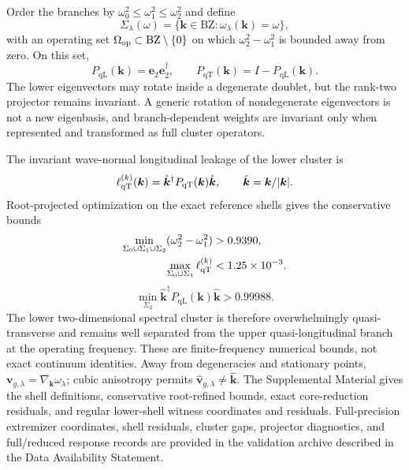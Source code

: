 \documentclass[10pt,aps,pre,reprint,floatfix,notitlepage,nofootinbib]{revtex4-2}
\newcommand{\vk}{\bm{k}}
\newcommand{\ve}{\bm{e}}
\newcommand{\BZ}{\mathrm{BZ}}
\newcommand{\PqT}{P_{\mathrm{qT}}}
\newcommand{\PqL}{P_{\mathrm{qL}}}
\begin{document}
Order the branches by $\omega_0^2\leq\omega_1^2\leq\omega_2^2$ and define
\begin{equation}
  \Sigma_\lambda(\omega)
  =\{\vk\in\BZ:\omega_\lambda(\vk)=\omega\},
  \label{eq:s4-branch-shell}
\end{equation}
with an operating set $\Omega_{\rm op}\subset\BZ\setminus\{0\}$ on which
$\omega_2^2-\omega_1^2$ is bounded away from zero.  On this set,
\begin{equation}
  \PqL(\vk)=\ve_2\ve_2^\dagger,
  \qquad
  \PqT(\vk)=I-\PqL(\vk).
  \label{eq:s4-cluster-projectors}
\end{equation}
The lower eigenvectors may rotate inside a degenerate doublet, but the rank-two projector remains invariant.  A generic rotation of nondegenerate eigenvectors is not a new eigenbasis, and branch-dependent weights are invariant only when represented and transformed as full cluster operators.

The invariant wave-normal longitudinal leakage of the lower cluster is
\begin{equation}
  \ell_{\rm qT}^{(k)}(\vk)
  =\hat{\vk}^{\dagger}\PqT(\vk)\hat{\vk},
  \qquad \hat{\vk}=\vk/|\vk|.
  \label{eq:s4-cluster-leakage}
\end{equation}
Root-projected optimization on the exact reference shells gives the conservative bounds
\begin{align}
  \min_{\Sigma_0\cup\Sigma_1\cup\Sigma_2}
  (\omega_2^2-\omega_1^2)&>0.9390,\\
  \max_{\Sigma_0\cup\Sigma_1}
  \ell_{\rm qT}^{(k)}&<1.25\times10^{-3}.
  \label{eq:s4-gap-leakage-bounds}
\end{align}
\begin{equation}
  \min_{\Sigma_2}
  \hat{\vk}^{\dagger}\PqL(\vk)\hat{\vk}>0.99988.
  \label{eq:s4-upper-purity}
\end{equation}
The lower two-dimensional spectral cluster is therefore overwhelmingly quasi-transverse and remains well separated from the upper quasi-longitudinal branch at the operating frequency.  These are finite-frequency numerical bounds, not exact continuum identities.  Away from degeneracies and stationary points, $\bm v_{g,\lambda}=\nabla_{\vk}\omega_\lambda$; cubic anisotropy permits $\widehat{\bm v}_{g,\lambda}\neq\hat{\vk}$.  The Supplemental Material gives the shell definitions, conservative root-refined bounds, exact core-reduction residuals, and regular lower-shell witness coordinates and residuals. Full-precision extremizer coordinates, shell residuals, cluster gaps, projector diagnostics, and full/reduced response records are provided in the validation archive described in the Data Availability Statement.
\end{document}

